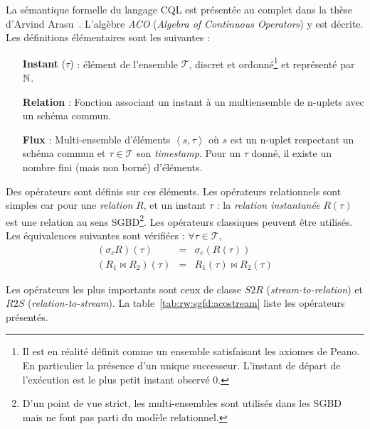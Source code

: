 La sémantique formelle du langage CQL est présentée au complet dans la thèse d'Arvind Arasu~\cite{Arasu:queries}. L'algèbre \textit{ACO} (\textit{Algebra of Continuous Operators}) y est décrite. Les définitions élémentaires sont les suivantes :
\begin{itemize}
 \item[\textbf{Instant} ($\tau$)] : élément de l'ensemble $\mathcal T$, discret et ordonné\footnote{Il est en réalité définit comme un ensemble satisfaisant les axiomes de Peano. En particulier la présence d'un unique successeur. L'instant de départ de l'exécution est le plus petit instant observé $0$.} et représenté par $\mathbb{N}$.
 \item[\textbf{Relation}] : Fonction associant un instant à un multiensemble de n-uplets avec un schéma commun.
 \item[\textbf{Flux}] : Multi-ensemble d'éléments $\left<s,\tau\right>$ où $s$ est un n-uplet respectant un schéma commun et $\tau \in \mathcal T$ son \textit{timestamp}. Pour un $\tau$ donné, il existe un nombre fini (mais non borné) d'éléments.
\end{itemize}
Des opérateurs sont définis sur ces éléments. Les opérateurs relationnels sont simples car pour une \textit{relation} $R$, et un instant $\tau$ : la \textit{relation instantanée} $R(\tau)$ est une relation au sens SGBD\footnote{D'un point de vue strict, les multi-ensembles sont utilisés dans les SGBD mais ne font pas parti du modèle relationnel.}. Les opérateurs classiques peuvent être utilisés. Les équivalences suivantes sont vérifiées : $\forall \tau\in\mathcal T,$ 
\begin{eqnarray*}
    (\sigma_c R)(\tau) & = & \sigma_c(R(\tau))\\
    (R_1 \Join R_2)(\tau) & = & R_1(\tau) \Join R_2(\tau)
\end{eqnarray*}

Les opérateurs les plus importants sont ceux de classe $S2R$ (\textit{stream-to-relation}) et $R2S$ (\textit{relation-to-stream}). La table~\ref{tab:rw:sgfd:acostream} liste les opérateurs présentés.

